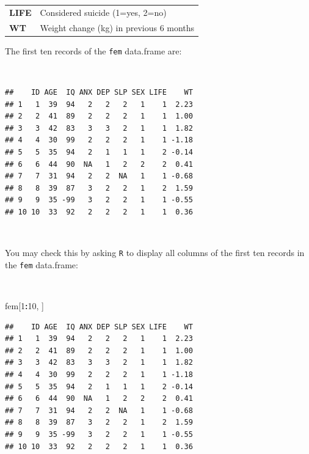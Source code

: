 \documentclass[12pt,a4paper]{book}
\newenvironment{Shaded}{\begin{snugshade}}{\end{snugshade}}
\newcommand{\DecValTok}[1]{\textcolor[rgb]{0.00,0.00,0.81}{#1}}
\newcommand{\NormalTok}[1]{#1}
\newcommand{\OperatorTok}[1]{\textcolor[rgb]{0.81,0.36,0.00}{\textbf{#1}}}
\theoremstyle{definition}
\theoremstyle{definition}
\theoremstyle{definition}
\theoremstyle{remark}
\begin{document}
\begin{longtable}[]{@{}ll@{}}
\begin{minipage}[t]{0.14\columnwidth}\raggedright
\textbf{LIFE}\strut
\end{minipage} & \begin{minipage}[t]{0.69\columnwidth}\raggedright
Considered suicide (1=yes, 2=no)\strut
\end{minipage}\tabularnewline
\begin{minipage}[t]{0.14\columnwidth}\raggedright
\textbf{WT}\strut
\end{minipage} & \begin{minipage}[t]{0.69\columnwidth}\raggedright
Weight change (kg) in previous 6 months\strut
\end{minipage}\tabularnewline
\bottomrule
\end{longtable}

\newpage

The first ten records of the \texttt{fem} data.frame are:

~

\begin{verbatim}
##    ID AGE  IQ ANX DEP SLP SEX LIFE    WT
## 1   1  39  94   2   2   2   1    1  2.23
## 2   2  41  89   2   2   2   1    1  1.00
## 3   3  42  83   3   3   2   1    1  1.82
## 4   4  30  99   2   2   2   1    1 -1.18
## 5   5  35  94   2   1   1   1    2 -0.14
## 6   6  44  90  NA   1   2   2    2  0.41
## 7   7  31  94   2   2  NA   1    1 -0.68
## 8   8  39  87   3   2   2   1    2  1.59
## 9   9  35 -99   3   2   2   1    1 -0.55
## 10 10  33  92   2   2   2   1    1  0.36
\end{verbatim}

~

You may check this by asking \texttt{R} to display all columns of the
first ten records in the \texttt{fem} data.frame:

~

\begin{Shaded}
\begin{Highlighting}[]
\NormalTok{fem[}\DecValTok{1}\OperatorTok{:}\DecValTok{10}\NormalTok{, ]}
\end{Highlighting}
\end{Shaded}

\begin{verbatim}
##    ID AGE  IQ ANX DEP SLP SEX LIFE    WT
## 1   1  39  94   2   2   2   1    1  2.23
## 2   2  41  89   2   2   2   1    1  1.00
## 3   3  42  83   3   3   2   1    1  1.82
## 4   4  30  99   2   2   2   1    1 -1.18
## 5   5  35  94   2   1   1   1    2 -0.14
## 6   6  44  90  NA   1   2   2    2  0.41
## 7   7  31  94   2   2  NA   1    1 -0.68
## 8   8  39  87   3   2   2   1    2  1.59
## 9   9  35 -99   3   2   2   1    1 -0.55
## 10 10  33  92   2   2   2   1    1  0.36
\end{verbatim}
\end{document}
